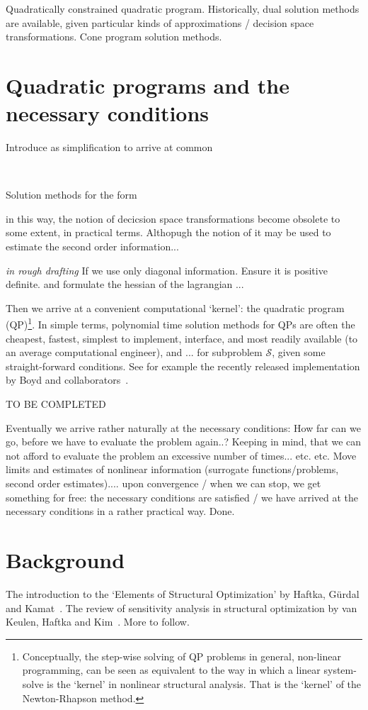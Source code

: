 \documentclass[11pt]{article}
\begin{document}
Quadratically constrained quadratic program. Historically, dual solution methods are available, given particular kinds of approximations / decision space transformations. Cone program solution methods.

\section{Quadratic programs and the necessary conditions}

Introduce as simplification to arrive at common 

~\cite{osqp}


Solution methods for the form

in this way, the notion of decicsion space transformations become obsolete to some extent, in practical terms. Althopugh the notion of it may be used to estimate the second order information... 

\emph{in rough drafting}
If we use only diagonal information. Ensure it is positive definite. and formulate the hessian of the lagrangian ... 

Then we arrive at a convenient computational `kernel': the quadratic program (QP)\footnote{Conceptually, the step-wise solving of QP problems in general, non-linear programming, can be seen as equivalent to the way in which a linear system-solve is the `kernel' in nonlinear structural analysis. That is the `kernel' of the Newton-Rhapson method.}. In simple terms, polynomial time solution methods for QPs are often the cheapest, fastest, simplest to implement, interface, and most readily available (to an average computational engineer), and ... for subproblem $\mathcal{S}$, given some straight-forward conditions. See for example the recently released implementation by Boyd and collaborators~\cite{osqp}.  

TO BE COMPLETED

Eventually we arrive rather naturally at the necessary conditions: How far can we go, before we have to evaluate the problem again..? Keeping in mind, that we can not afford to evaluate the problem an excessive number of times... etc. etc. Move limits and estimates of nonlinear information (surrogate functions/problems, second order estimates).... upon convergence / when we can stop, we get something for free: the necessary conditions are satisfied / we have arrived at the necessary conditions in a rather practical way. Done.


\section*{Background}

The introduction to the `Elements of Structural Optimization' by Haftka, G\"urdal and Kamat~\cite{haftka1990}. The review of sensitivity analysis in structural optimization by van Keulen, Haftka and Kim~\cite{keulen2005}. More to follow. 

 
 
\end{document}
